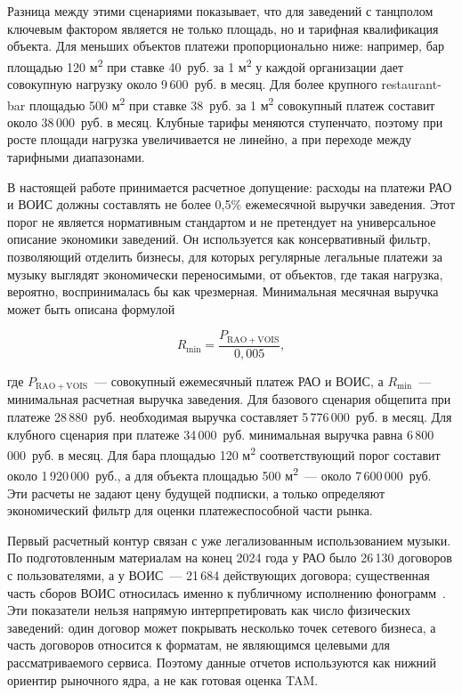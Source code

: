 Разница между этими сценариями показывает, что для заведений с танцполом ключевым фактором является не только площадь, но и тарифная квалификация объекта. Для меньших объектов платежи пропорционально ниже: например, бар площадью 120 м\textsuperscript{2} при ставке 40~руб. за 1 м\textsuperscript{2} у каждой организации дает совокупную нагрузку около 9\,600~руб. в месяц. Для более крупного restaurant-bar площадью 500 м\textsuperscript{2} при ставке 38~руб. за 1 м\textsuperscript{2} совокупный платеж составит около 38\,000~руб. в месяц. Клубные тарифы меняются ступенчато, поэтому при росте площади нагрузка увеличивается не линейно, а при переходе между тарифными диапазонами.

В настоящей работе принимается расчетное допущение: расходы на платежи РАО и ВОИС должны составлять не более 0{,}5\% ежемесячной выручки заведения. Этот порог не является нормативным стандартом и не претендует на универсальное описание экономики заведений. Он используется как консервативный фильтр, позволяющий отделить бизнесы, для которых регулярные легальные платежи за музыку выглядят экономически переносимыми, от объектов, где такая нагрузка, вероятно, воспринималась бы как чрезмерная. Минимальная месячная выручка может быть описана формулой

\begin{equation*}
    R_{\min} = \frac{P_{\mathrm{RAO+VOIS}}}{0{,}005},
\end{equation*}

где $P_{\mathrm{RAO+VOIS}}$~--- совокупный ежемесячный платеж РАО и ВОИС, а $R_{\min}$~--- минимальная расчетная выручка заведения. Для базового сценария общепита при платеже 28\,880~руб. необходимая выручка составляет 5\,776\,000~руб. в месяц. Для клубного сценария при платеже 34\,000~руб. минимальная выручка равна 6\,800\,000~руб. в месяц. Для бара площадью 120 м\textsuperscript{2} соответствующий порог составит около 1\,920\,000~руб., а для объекта площадью 500 м\textsuperscript{2}~--- около 7\,600\,000~руб. Эти расчеты не задают цену будущей подписки, а только определяют экономический фильтр для оценки платежеспособной части рынка.

Первый расчетный контур связан с уже легализованным использованием музыки. По подготовленным материалам на конец 2024 года у РАО было 26\,130 договоров с пользователями, а у ВОИС~--- 21\,684 действующих договора; существенная часть сборов ВОИС относилась именно к публичному исполнению фонограмм~\cite{rao_annual_report_2024,vois_annual_report_2024}. Эти показатели нельзя напрямую интерпретировать как число физических заведений: один договор может покрывать несколько точек сетевого бизнеса, а часть договоров относится к форматам, не являющимся целевыми для рассматриваемого сервиса. Поэтому данные отчетов используются как нижний ориентир рыночного ядра, а не как готовая оценка TAM.

